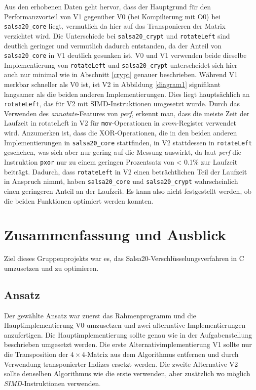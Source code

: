 \documentclass[course=erap]{aspdoc}
\begin{document}
Aus den erhobenen Daten geht hervor, dass der Hauptgrund für den Performanzvorteil von 
V1 gegenüber V0 (bei Kompilierung mit O0) bei \texttt{salsa20\_core} liegt, vermutlich da hier auf das 
Transponieren der Matrix verzichtet wird.
Die Unterschiede bei \texttt{salsa20\_crypt} und \texttt{rotateLeft} sind deutlich geringer und vermutlich dadurch
entstanden, da der Anteil von \texttt{salsa20\_core} in V1 deutlich gesunken ist. V0 und V1 verwenden beide
dieselbe Implementierung von \texttt{rotateLeft} und \texttt{salsa20\_crypt} unterscheidet sich hier auch nur minimal
wie in Abschnitt \ref{crypt} genauer beschrieben. Während V1 merkbar schneller als V0 ist, ist V2 in Abbildung 
\ref{diagram1} signifikant langsamer als die beiden anderen Implementierungen. Dies liegt hauptsächlich an \texttt{rotateLeft}, 
das für V2 mit SIMD-Instruktionen umgesetzt wurde. Durch das Verwenden des \emph{annotate}-Features von 
\emph{perf}, erkennt man, dass die meiste Zeit der Laufzeit in rotateLeft in V2 für \texttt{mov}-Operationen in 
\emph{xmm}-Register verwendet wird. Anzumerken ist, dass die XOR-Operationen, die in den beiden anderen Implementierungen
in \texttt{salsa20\_core} stattfinden, in V2 stattdessen in \texttt{rotateLeft} geschehen, was sich aber nur gering 
auf die Messung auswirkt, da laut \emph{perf} die Instruktion \texttt{pxor} nur zu einem geringen 
Prozentsatz von < 0.1\% zur Laufzeit beiträgt.
Dadurch, dass \texttt{rotateLeft} in V2 einen beträchtlichen Teil der Laufzeit in Anspruch nimmt,
haben \texttt{salsa20\_core} und \texttt{salsa20\_crypt} wahrscheinlich einen geringeren Anteil an der Laufzeit. Es kann 
also nicht festgestellt werden, ob die beiden Funktionen optimiert werden konnten.


\section{Zusammenfassung und Ausblick}
Ziel dieses Gruppenprojekts war es, das Salsa20-Verschlüsselungsverfahren in C umzusetzen und zu optimieren.

\subsection{Ansatz}
Der gewählte Ansatz war zuerst das Rahmenprogramm und die Hauptimplementierung V0 umzusetzen 
und zwei alternative Implementierungen anzufertigen. Die Hauptimplementierung sollte genau wie 
in der Aufgabenstellung beschrieben umgesetzt werden.
Die erste Alternativimplementierung V1 sollte nur die Transposition der $4\times 4$-Matrix aus 
dem Algorithmus entfernen und durch Verwendung transponierter Indizes ersetzt werden. Die zweite Alternative V2
sollte denselben Algorithmus wie die erste verwenden, aber zusätzlich wo möglich \emph{SIMD}-Instruktionen verwenden.
\end{document}
